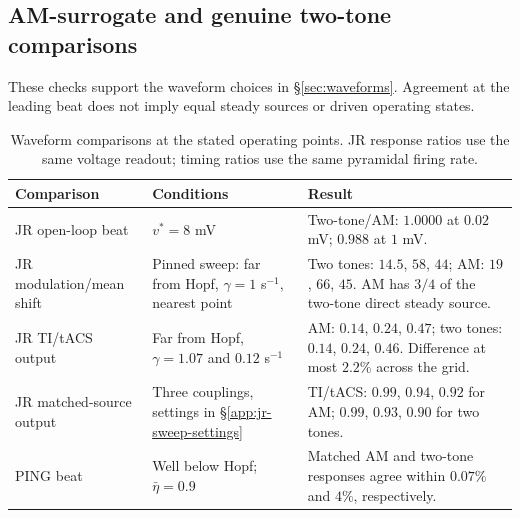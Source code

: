 \subsection{AM-surrogate and genuine two-tone comparisons}\label{supp:waveform-checks}
These checks support the waveform choices in \S\ref{sec:waveforms}. Agreement
at the leading beat does not imply equal steady sources or driven operating states.

\begin{table}[htbp]\centering\small
\caption{Waveform comparisons at the stated operating points. JR response ratios
use the same voltage readout; timing ratios use the same pyramidal firing rate.}
\label{tab:waveform-checks}
\begin{tabular}{@{}p{4.3cm}p{4.5cm}p{6cm}@{}}
\toprule
Comparison & Conditions & Result\\
\midrule
JR open-loop beat & $v^*=8$ mV & Two-tone/AM: $1.0000$ at $0.02$ mV; $0.988$ at $1$ mV.\\
JR modulation/mean shift & Pinned sweep: far from Hopf, $\gamma=1$ s$^{-1}$, nearest point & Two tones: $14.5$, $58$, $44$; AM: $19$, $66$, $45$. AM has $3/4$ of the two-tone direct steady source.\\
JR TI/tACS output & Far from Hopf, $\gamma=1.07$ and $0.12$ s$^{-1}$ & AM: $0.14$, $0.24$, $0.47$; two tones: $0.14$, $0.24$, $0.46$. Difference at most $2.2\%$ across the grid.\\
JR matched-source output & Three couplings, settings in \S\ref{app:jr-sweep-settings} & TI/tACS: $0.99$, $0.94$, $0.92$ for AM; $0.99$, $0.93$, $0.90$ for two tones.\\
PING beat & Well below Hopf; $\bar\eta=0.9$ & Matched AM and two-tone responses agree within $0.07\%$ and $4\%$, respectively.\\
\bottomrule
\end{tabular}
\end{table}
